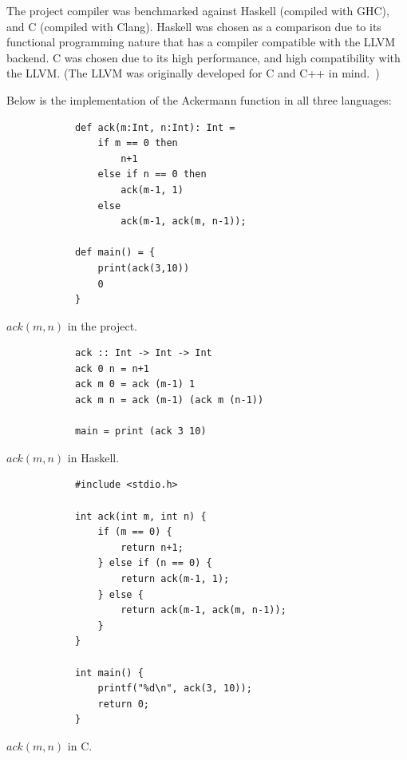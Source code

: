 The project compiler was benchmarked against Haskell (compiled with GHC), and C (compiled with
Clang). Haskell was chosen as a comparison due to its functional programming nature that has a
compiler compatible with the LLVM backend. C was chosen due to its high performance, and high
compatibility with the LLVM. (The LLVM was originally developed for C and C++ in
mind.~\autocite{lattner2004llvm})

Below is the implementation of the Ackermann function in all three languages:

\vspace{0.3cm}
\begin{tcbitemize}[raster columns=3, raster equal height=rows,size=small,space to upper]
    \tcbitem
        \footnotesize
        \begin{verbatim}
            def ack(m:Int, n:Int): Int =
                if m == 0 then
                    n+1
                else if n == 0 then
                    ack(m-1, 1)
                else
                    ack(m-1, ack(m, n-1));

            def main() = {
                print(ack(3,10))
                0
            }
        \end{verbatim}
        \tcblower
        \footnotesize $ack(m, n)$ in the project.
    \tcbitem
        \footnotesize
        \begin{verbatim}
            ack :: Int -> Int -> Int
            ack 0 n = n+1
            ack m 0 = ack (m-1) 1
            ack m n = ack (m-1) (ack m (n-1))

            main = print (ack 3 10)
        \end{verbatim}
        \vfill
        \tcblower
        \footnotesize $ack(m, n)$ in Haskell.
    \tcbitem
        \scriptsize
        \begin{verbatim}
            #include <stdio.h>

            int ack(int m, int n) {
                if (m == 0) {
                    return n+1;
                } else if (n == 0) {
                    return ack(m-1, 1);
                } else {
                    return ack(m-1, ack(m, n-1));
                }
            }

            int main() {
                printf("%d\n", ack(3, 10));
                return 0;
            }
        \end{verbatim}
        \tcblower
        \footnotesize $ack(m, n)$ in C.
\end{tcbitemize}
\vspace{0.4cm}


